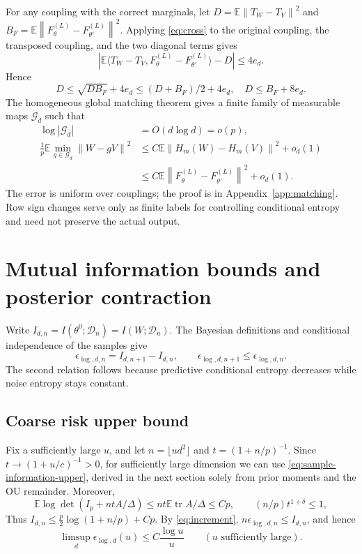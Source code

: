 \documentclass[a4paper]{tufte-handout}
\newcommand{\E}{\mathbb E}
\newcommand{\norm}[1]{\left\|#1\right\|}
\DeclareMathOperator{\tr}{tr}
\begin{document}
\begin{fullwidth}
For any coupling with the correct marginals, let
$D=\E\norm{T_W-T_V}^2$ and $B_F=\E\norm{F_\theta^{(L)}-F_{\theta'}^{(L)}}^2$.
Applying \eqref{eq:cross} to the original coupling, the transposed coupling, and the two diagonal terms gives
\[
|\E\langle T_W-T_V,F_\theta^{(L)}-F_{\theta'}^{(L)}\rangle-D|\le4e_d.
\]
Hence
\[
D\le\sqrt{DB_F}+4e_d\le(D+B_F)/2+4e_d,
\quad D\le B_F+8e_d.
\]
The homogeneous global matching theorem gives a finite family of measurable maps $\mathcal G_d$ such that
\begin{equation}\label{eq:matching}\begin{aligned}
\log|\mathcal G_d|&=O(d\log d)=o(p),\\
\frac1p\E\min_{g\in\mathcal G_d}\norm{W-gV}^2
&\le C\E\norm{H_m(W)-H_m(V)}^2+o_d(1)\\
&\le C\E\norm{F_\theta^{(L)}-F_{\theta'}^{(L)}}^2+o_d(1).
\end{aligned}\end{equation}
The error is uniform over couplings; the proof is in Appendix~\ref{app:matching}. Row sign changes serve only as finite labels for controlling conditional entropy and need not preserve the actual output.

\section{Mutual information bounds and posterior contraction}
Write $I_{d,n}=I(\theta^0;\mathcal D_n)=I(W;\mathcal D_n)$. The Bayesian definitions and conditional independence of the samples give
\begin{equation}\label{eq:increment}
\epsilon_{\log,d,n}=I_{d,n+1}-I_{d,n},\qquad
\epsilon_{\log,d,n+1}\le \epsilon_{\log,d,n}.
\end{equation}
The second relation follows because predictive conditional entropy decreases while noise entropy stays constant.

\subsection{Coarse risk upper bound}
Fix a sufficiently large $u$, and let $n=\lfloor ud^2\rfloor$ and $t=(1+n/p)^{-1}$.
Since $t\to(1+u/c)^{-1}>0$, for sufficiently large dimension we can use \eqref{eq:sample-information-upper}, derived in the next section solely from prior moments and the OU remainder. Moreover,
\[
 \E\log\det(I_p+ntA/\Delta)\le nt\E\tr A/\Delta\le Cp,
 \qquad (n/p)t^{1+\delta}\le1,
\]
Thus $I_{d,n}\le\frac p2\log(1+n/p)+Cp$.
By \eqref{eq:increment}, $n\epsilon_{\log,d,n}\le I_{d,n}$, and hence
\begin{equation}\label{eq:coarse}
 \limsup_d\epsilon_{\log,d}(u)\le C\frac{\log u}{u}
 \qquad(u\text{ sufficiently large}).
\end{equation}


\end{fullwidth}
\end{document}
